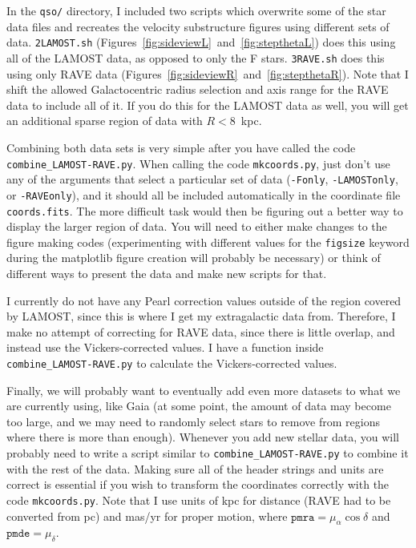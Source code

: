 \documentclass{article}
\begin{document}
In the \texttt{qso/} directory, I included two scripts which overwrite some of the star data files and recreates the velocity substructure figures using different sets of data. \texttt{2LAMOST.sh} (Figures~\ref{fig:sideviewL}~and~\ref{fig:stepthetaL}) does this using all of the LAMOST data, as opposed to only the F stars. \texttt{3RAVE.sh} does this using only RAVE data (Figures~\ref{fig:sideviewR}~and~\ref{fig:stepthetaR}). Note that I shift the allowed Galactocentric radius selection and axis range for the RAVE data to include all of it. If you do this for the LAMOST data as well, you will get an additional sparse region of data with $R < 8$~kpc.

Combining both data sets is very simple after you have called the code \texttt{combine\_LAMOST-RAVE.py}. When calling the code \texttt{mkcoords.py}, just don't use any of the arguments that select a particular set of data (\texttt{-Fonly}, \texttt{-LAMOSTonly}, or \texttt{-RAVEonly}), and it should all be included automatically in the coordinate file \texttt{coords.fits}. The more difficult task would then be figuring out a better way to display the larger region of data. You will need to either make changes to the figure making codes (experimenting with different values for the \texttt{figsize} keyword during the matplotlib figure creation will probably be necessary) or think of different ways to present the data and make new scripts for that.

I currently do not have any Pearl correction values outside of the region covered by LAMOST, since this is where I get my extragalactic data from. Therefore, I make no attempt of correcting for RAVE data, since there is little overlap, and instead use the Vickers-corrected values. I have a function inside \texttt{combine\_LAMOST-RAVE.py} to calculate the Vickers-corrected values.

Finally, we will probably want to eventually add even more datasets to what we are currently using, like Gaia (at some point, the amount of data may become too large, and we may need to randomly select stars to remove from regions where there is more than enough). Whenever you add new stellar data, you will probably need to write a script similar to \texttt{combine\_LAMOST-RAVE.py} to combine it with the rest of the data. Making sure all of the header strings and units are correct is essential if you wish to transform the coordinates correctly with the code \texttt{mkcoords.py}. Note that I use units of kpc for distance (RAVE had to be converted from pc) and mas/yr for proper motion, where $\texttt{pmra} = \mu_\alpha \cos{\delta}$ and $\texttt{pmde} = \mu_\delta$.
\end{document}
